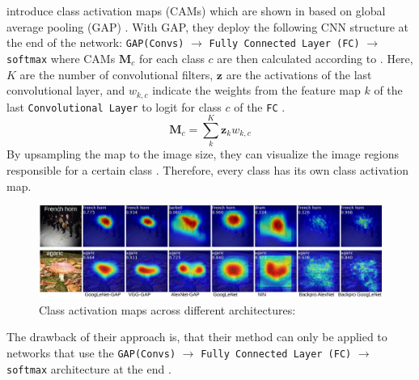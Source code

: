 \citet{ZhouKLOT16} introduce class activation maps (CAMs) which are shown in  based on global average pooling (GAP) \citep{LinCY13}. With GAP, they deploy the following CNN structure at the end of the network: \texttt{GAP(Convs)} $\rightarrow$ \texttt{Fully Connected Layer (FC)} $\rightarrow$ \texttt{softmax} where CAMs $\mathbf{M}_{c}$ for each class $c$ are then calculated according to . Here, $K$ are the number of convolutional filters, $\mathbf{z}$ are the activations of the last convolutional layer, and $ w_{k, c}$ indicate the weights from the feature map $k$ of the last \texttt{Convolutional Layer} to logit for class $c$ of the \texttt{FC} \citep{ZhouKLOT16}.
\begin{equation}
\label{eq:cam}
    \mathbf{M}_{c}=\sum_{k}^{K} \mathbf{z}_k w_{k, c} 
\end{equation}
By upsampling the map to the image size, they can visualize the image regions responsible for a certain class \citep{ZhouKLOT16}. Therefore, every class has its own class activation map. 
\begin{figure}[htbp]
    \centering
    \includegraphics[width=\textwidth]{Figures/Chapter3/heatmapAll.pdf}
    \caption[Class activation maps across different architectures]{Class activation maps across different architectures: \citep{ZhouKLOT16}}
    \label{fig:cams}
\end{figure}
The drawback of their approach is, that their method can only be applied to networks that use the \texttt{GAP(Convs)} $\rightarrow$ \texttt{Fully Connected Layer (FC)} $\rightarrow$ \texttt{softmax} architecture at the end \citep{xie2020explainable}. 

